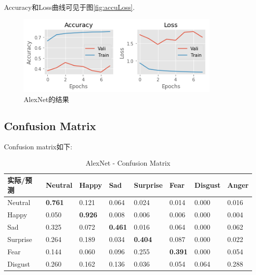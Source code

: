 \documentclass[11pt, a4paper]{article}
\begin{document}
\begin{CJK}{UTF8}{gbsn}
Accuracy和Loss曲线可见于图\ref{fig:accuLoss}.

\begin{figure}[htbp]
	\centering %
	\includegraphics[width=10cm]{alexaccu}
	\caption{AlexNet的结果}
	\label{fig:alexaccu}
\end{figure}

\subsection{Confusion Matrix}

Confusion matrix如下:
\begin{table}[htbp] 
	\begin{center}
		\caption{AlexNet - Confusion Matrix}
		\begin{tabular}{ | l | l | l | l | l |l | l |l |  }  \hline
			实际/预测 &  Neutral  & Happy & Sad   &  Surprise   &  Fear  & Disgust  & Anger  \\ \hline
			
			Neutral  &  \textbf{0.761}  &  0.121  &  0.064  &  0.024  &  0.014  &  0.000  &  0.016 \\ \hline
			
			Happy   & 0.050  &  \textbf{0.926}  &  0.008  &  0.006  &  0.006  &  0.000  &  0.004  \\ \hline
			
			Sad    & 0.325  &  0.072  & \textbf{ 0.461}  &  0.016  &  0.064  &  0.000  &  0.062  \\ \hline
			
			Surprise  &  0.264  &  0.189  &  0.034  &  \textbf{0.404}  &  0.087  &  0.000  &  0.022  \\ \hline
			
			Fear     &  0.144  &  0.060  &  0.096  &  0.255  &  \textbf{0.391}  &  0.000  &  0.054 \\ \hline
			
			Disgust      &  0.260  &  0.162  &  0.136  &  0.036  &  0.054  &  0.064  &  0.288 \\ \hline
			

\end{tabular}
\end{center}
\end{table}
\end{CJK}
\end{document}
